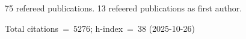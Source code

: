 75 refereed publications. 13 refeered publications as first author.

Total citations~=~5276; h-index~=~38 (2025-10-26)